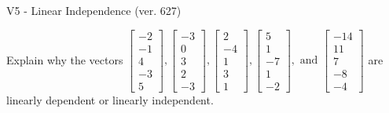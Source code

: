 \begin{exercise}
  \begin{exerciseTitle}V5 - Linear Independence (ver. 627)\end{exerciseTitle}
  \begin{exerciseStatement}
    Explain why the vectors \(\left[\begin{array}{r}
-2 \\
-1 \\
4 \\
-3 \\
5
\end{array}\right] , \left[\begin{array}{r}
-3 \\
0 \\
3 \\
2 \\
-3
\end{array}\right] , \left[\begin{array}{r}
2 \\
-4 \\
1 \\
3 \\
1
\end{array}\right] , \left[\begin{array}{r}
5 \\
1 \\
-7 \\
1 \\
-2
\end{array}\right] , \text{ and } \left[\begin{array}{r}
-14 \\
11 \\
7 \\
-8 \\
-4
\end{array}\right]\) are linearly dependent or linearly independent.	



\end{exerciseStatement}
\end{exercise}
